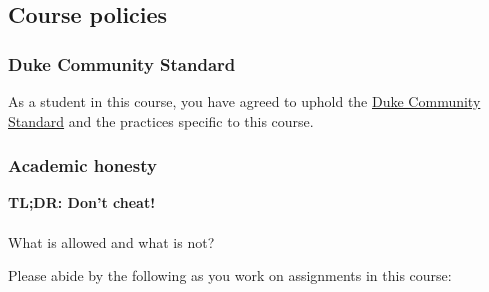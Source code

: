 \documentclass[
  letterpaper,
  DIV=11,
  numbers=noendperiod]{scrartcl}
\makeatletter
\let\oldparagraph\paragraph
\renewcommand{\paragraph}{
    \@ifstar
      \xxxParagraphStar
      \xxxParagraphNoStar
  }
\newcommand{\xxxParagraphStar}[1]{\oldparagraph*{#1}\mbox{}}
\newcommand{\xxxParagraphNoStar}[1]{\oldparagraph{#1}\mbox{}}
\makeatother
\begin{document}
\subsection{Course policies}\label{course-policies}

\subsubsection{Duke Community Standard}\label{duke-community-standard}

As a student in this course, you have agreed to uphold the
\href{https://trinity.duke.edu/undergraduate/academic-policies/community-standard-student-conduct}{Duke
Community Standard} and the practices specific to this course.

\subsubsection{Academic honesty}\label{academic-honesty-1}

\textbf{TL;DR: Don't cheat!}

\paragraph{What is allowed and what is
not?}\label{what-is-allowed-and-what-is-not}

Please abide by the following as you work on assignments in this course:
\end{document}
